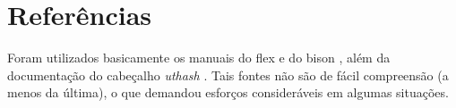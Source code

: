 \documentclass[
	article,			%
	11pt,				%
	oneside,			%
	a4paper,			%
	english,			%
	brazil,				%
	sumario=tradicional
	]{abntex2}
\renewcommand{\it}[1]{\textit{#1}}
\begin{document}
\section{Referências}
Foram utilizados basicamente os manuais do flex \cite{flex} e do bison \cite{bison}, além da documentação do cabeçalho \it{uthash} \cite{uthash}. Tais fontes não são de fácil compreensão (a menos da última), o que demandou esforços consideráveis em algumas situações.
% 

\postextual


\end{document}
